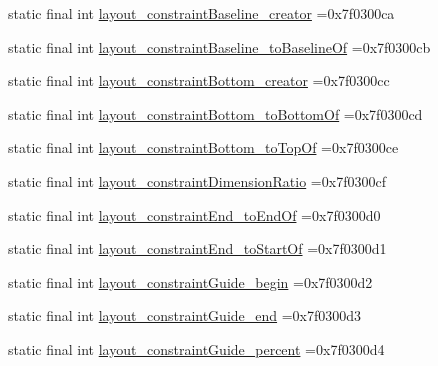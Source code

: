 \begin{DoxyCompactItemize}
\item 
static final int \mbox{\hyperlink{classbr_1_1unb_1_1cic_1_1mp_1_1marketmaster_1_1R_1_1attr_ab7bc391c0e11890a45b49dd1670a8967}{layout\+\_\+constraint\+Baseline\+\_\+creator}} =0x7f0300ca
\item 
static final int \mbox{\hyperlink{classbr_1_1unb_1_1cic_1_1mp_1_1marketmaster_1_1R_1_1attr_a1eedb378235afe1c5493121628108b2b}{layout\+\_\+constraint\+Baseline\+\_\+to\+Baseline\+Of}} =0x7f0300cb
\item 
static final int \mbox{\hyperlink{classbr_1_1unb_1_1cic_1_1mp_1_1marketmaster_1_1R_1_1attr_a211e469a736aff2ee77cc4df7b9a1367}{layout\+\_\+constraint\+Bottom\+\_\+creator}} =0x7f0300cc
\item 
static final int \mbox{\hyperlink{classbr_1_1unb_1_1cic_1_1mp_1_1marketmaster_1_1R_1_1attr_aed6eafb01390c2ec4ae844ecd1d6b9f8}{layout\+\_\+constraint\+Bottom\+\_\+to\+Bottom\+Of}} =0x7f0300cd
\item 
static final int \mbox{\hyperlink{classbr_1_1unb_1_1cic_1_1mp_1_1marketmaster_1_1R_1_1attr_a57edcd16d73518020f163daf4270737d}{layout\+\_\+constraint\+Bottom\+\_\+to\+Top\+Of}} =0x7f0300ce
\item 
static final int \mbox{\hyperlink{classbr_1_1unb_1_1cic_1_1mp_1_1marketmaster_1_1R_1_1attr_a9b82fcd145b82bbc8298f5ed996d7180}{layout\+\_\+constraint\+Dimension\+Ratio}} =0x7f0300cf
\item 
static final int \mbox{\hyperlink{classbr_1_1unb_1_1cic_1_1mp_1_1marketmaster_1_1R_1_1attr_a1b579a2876e6a200db53511d142247b0}{layout\+\_\+constraint\+End\+\_\+to\+End\+Of}} =0x7f0300d0
\item 
static final int \mbox{\hyperlink{classbr_1_1unb_1_1cic_1_1mp_1_1marketmaster_1_1R_1_1attr_aa37eb621b318f9df729fc7498b7e5320}{layout\+\_\+constraint\+End\+\_\+to\+Start\+Of}} =0x7f0300d1
\item 
static final int \mbox{\hyperlink{classbr_1_1unb_1_1cic_1_1mp_1_1marketmaster_1_1R_1_1attr_a270a778b18f6f1f8890c48c8015c597e}{layout\+\_\+constraint\+Guide\+\_\+begin}} =0x7f0300d2
\item 
static final int \mbox{\hyperlink{classbr_1_1unb_1_1cic_1_1mp_1_1marketmaster_1_1R_1_1attr_a1b376ba1c41ea23a459f1361c19ea90a}{layout\+\_\+constraint\+Guide\+\_\+end}} =0x7f0300d3
\item 
static final int \mbox{\hyperlink{classbr_1_1unb_1_1cic_1_1mp_1_1marketmaster_1_1R_1_1attr_a5f36dfc6abaeb7a391736283f872e5e1}{layout\+\_\+constraint\+Guide\+\_\+percent}} =0x7f0300d4
\item 

\end{DoxyCompactItemize}
